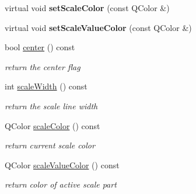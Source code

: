 \begin{DoxyCompactItemize}
\begin{DoxyCompactList}
 \end{DoxyCompactList}\item 
\mbox{\label{class_awl_1_1_abstract_slider_a2f7b1b96b92fa240f1c35ab69d989b78}} 
virtual void {\bfseries set\+Scale\+Color} (const Q\+Color \&)
\item 
\mbox{\label{class_awl_1_1_abstract_slider_a28ab8315f89b04fd18e1aadc35734322}} 
virtual void {\bfseries set\+Scale\+Value\+Color} (const Q\+Color \&)
\item 
\mbox{\label{class_awl_1_1_abstract_slider_ad29dccc1cdb2e8d408883bc242b635ff}} 
bool \hyperlink{class_awl_1_1_abstract_slider_ad29dccc1cdb2e8d408883bc242b635ff}{center} () const
\begin{DoxyCompactList}\small\item\em return the center flag \end{DoxyCompactList}\item 
\mbox{\label{class_awl_1_1_abstract_slider_ac27686c98ff267554ef91c1d25f25373}} 
int \hyperlink{class_awl_1_1_abstract_slider_ac27686c98ff267554ef91c1d25f25373}{scale\+Width} () const
\begin{DoxyCompactList}\small\item\em return the scale line width \end{DoxyCompactList}\item 
\mbox{\label{class_awl_1_1_abstract_slider_a6e5e065dbaff05a84363e650b15fba66}} 
Q\+Color \hyperlink{class_awl_1_1_abstract_slider_a6e5e065dbaff05a84363e650b15fba66}{scale\+Color} () const
\begin{DoxyCompactList}\small\item\em return current scale color \end{DoxyCompactList}\item 
\mbox{\label{class_awl_1_1_abstract_slider_ac784edbf65e4231a9fd711f4e1bfcaa9}} 
Q\+Color \hyperlink{class_awl_1_1_abstract_slider_ac784edbf65e4231a9fd711f4e1bfcaa9}{scale\+Value\+Color} () const
\begin{DoxyCompactList}\small\item\em return color of active scale part \end{DoxyCompactList}\item 

\end{DoxyCompactItemize}
